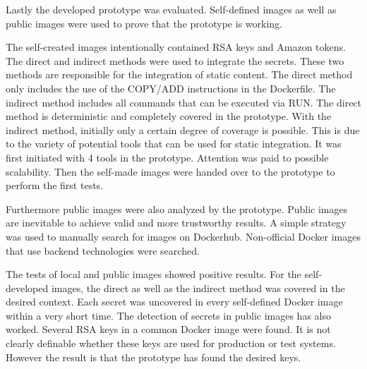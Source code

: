 Lastly the developed prototype was evaluated. 
Self-defined images as well as public images were used to prove that the prototype is working.

The self-created images intentionally contained RSA keys and Amazon tokens.
The direct and indirect methods were used to integrate the secrets.
These two methods are responsible for the integration of static content.
The direct method only includes the use of the COPY/ADD instructions in the Dockerfile.
The indirect method includes all commands that can be executed via RUN.
The direct method is deterministic and completely covered in the prototype.
With the indirect method, initially only a certain degree of coverage is possible.
This is due to the variety of potential tools that can be used for static integration.
It was first initiated with 4 tools in the prototype. Attention was paid to possible scalability.
Then the self-made images were handed over to the prototype to perform the first tests.

Furthermore public images were also analyzed by the prototype.
Public images are inevitable to achieve valid and more trustworthy results.
A simple strategy was used to manually search for images on Dockerhub.
Non-official Docker images that use backend technologies were searched.

The tests of local and public images showed positive results.
For the self-developed images, the direct as well as the indirect method was covered in the desired context.
Each secret was uncovered in every self-defined Docker image within a very short time.
The detection of secrets in public images has also worked.
Several RSA keys in a common Docker image were found.
It is not clearly definable whether these keys are used for production or test systems.
However the result is that the prototype has found the desired keys.





